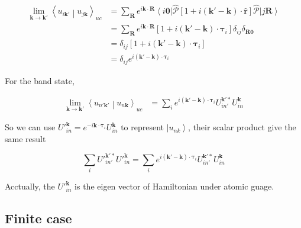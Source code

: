 \documentclass{report}
\begin{document}
\begin{equation}
  \begin{aligned}
    \lim_{\boldsymbol{k} \rightarrow \boldsymbol{k}'} \left\langle u_{i\boldsymbol{k}'} \middle| u_{j\boldsymbol{k}} \right\rangle_{uc} 
    &= \sum_{\boldsymbol{R}} e^{i\boldsymbol{k} \cdot \boldsymbol{R}} 
        \left\langle i\boldsymbol{0} \right| \hat{\mathcal{P}} 
        \left[ 1 + i(\boldsymbol{k}'-\boldsymbol{k}) \cdot \hat{\boldsymbol{r}} \right] 
        \hat{\mathcal{P}} \left| j\boldsymbol{R} \right\rangle \\
    &= \sum_{\boldsymbol{R}} e^{i\boldsymbol{k} \cdot \boldsymbol{R}} 
      \left[ 1 + i(\boldsymbol{k}'-\boldsymbol{k}) \cdot \boldsymbol{\tau}_{i} \right] 
      \delta_{ij}\delta_{\boldsymbol{R}\boldsymbol{0}} \\
    &= \delta_{ij} \left[ 1 + i(\boldsymbol{k}'-\boldsymbol{k}) \cdot \boldsymbol{\tau}_{i} \right] \\
    &= \delta_{ij} e^{i(\boldsymbol{k}'-\boldsymbol{k}) \cdot \boldsymbol{\tau}_{i}} 
  \end{aligned}
\end{equation}

\noindent
For the band state,

\begin{equation}
  \begin{aligned}
    \lim_{\boldsymbol{k} \rightarrow \boldsymbol{k}'} \left\langle u_{n'\boldsymbol{k}'} \middle| u_{n\boldsymbol{k}} \right\rangle_{uc} 
    &= \sum_{i} e^{i(\boldsymbol{k}'-\boldsymbol{k}) \cdot \boldsymbol{\tau}_{i}} U_{in'}^{\boldsymbol{k}'*} U_{in}^{\boldsymbol{k}}
  \end{aligned}
\end{equation}

So we can use ${U'}_{in}^{\boldsymbol{k}} = e^{-i\boldsymbol{k} \cdot \boldsymbol{\tau}_{i}} U_{in}^{\boldsymbol{k}}$ to represent $\left| u_{nk} \right\rangle$,
their scalar product give the same result

\begin{equation}
  \sum_{i} {U'}_{in'}^{\boldsymbol{k}'*} {U'}_{in}^{\boldsymbol{k}} 
    = \sum_{i} e^{i(\boldsymbol{k}'-\boldsymbol{k}) \cdot \boldsymbol{\tau}_{i}} U_{in'}^{\boldsymbol{k}'*} U_{in}^{\boldsymbol{k}}
\end{equation}

\noindent
Acctually, the ${U'}_{in}^{\boldsymbol{k}}$ is the eigen vector of Hamiltonian under atomic guage.

\subsection{Finite case}
\end{document}

